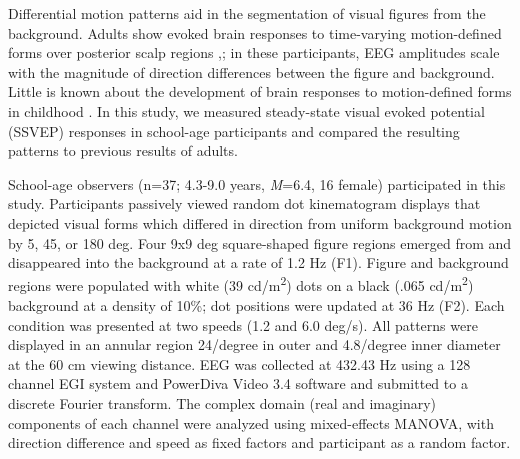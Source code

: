 \documentclass[landscape,final,paperwidth=72in,paperheight=42in,fontscale=0.285]{baposter}
\begin{document}
\begin{poster}
    {
      Differential motion patterns aid in the segmentation of visual figures from the background. 
Adults show evoked brain responses to time-varying motion-defined forms over posterior scalp regions \cite{fesi_cortical_2014},\cite{fesi_distinct_2011}; in these participants, EEG amplitudes scale with the magnitude of direction differences between the figure and background.
      Little is known about the development of brain responses to motion-defined forms in childhood \cite{gilmore_childrens_2016}. In this study, we measured steady-state visual evoked potential (SSVEP) responses in school-age participants and compared the resulting patterns to previous results of adults.    
    }

    {
      School-age observers (n=37; 4.3-9.0 years, \emph{M}=6.4, 16 female) participated in this study.  
      Participants passively viewed random dot kinematogram displays that depicted visual forms which differed in direction from uniform background motion by 5, 45, or 180 deg. Four 9x9 deg square-shaped figure regions emerged from and disappeared into the background at a rate of 1.2 Hz (F1). Figure and background regions were populated with white (39 cd/m\textsuperscript{2}) dots on a black (.065 cd/m\textsuperscript{2}) background at a density of 10\%; dot positions were updated at 36 Hz (F2). Each condition was presented at two speeds (1.2 and 6.0 deg/s). All patterns were displayed in an annular region 24/degree in outer and 4.8/degree inner diameter at the 60 cm viewing distance.  
      EEG was collected at 432.43 Hz using a 128 channel EGI system and PowerDiva Video 3.4 software and submitted to a discrete Fourier transform. 
      The complex domain (real and imaginary) components of each channel were analyzed using mixed-effects MANOVA, with direction difference and speed as fixed factors and participant as a random factor.  
      }

    {
      \vspace{2em}

}
\end{poster}
\end{document}
